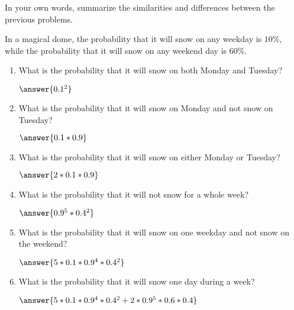 \documentclass[nooutcomes]{ximera}
\begin{document}
\begin{problem}
In your own words, summarize the similarities and differences between the previous problems.

\begin{freeResponse}
\end{freeResponse}
\end{problem}



\begin{problem}
In a magical dome, the probability that it will snow on any weekday is $10\%$, while the probability that it will snow on any weekend day is $60\%$.

\begin{enumerate}
	\item What is the probability that it will snow on both Monday and Tuesday? \begin{prompt} $\answer{0.1^2}$ \end{prompt}
	\item What is the probability that it will snow on Monday and not snow on Tuesday? \begin{prompt} $\answer{0.1*0.9}$ \end{prompt}
	\item What is the probability that it will snow on either Monday or Tuesday? \begin{prompt} $\answer{2*0.1*0.9}$ \end{prompt}
	\item What is the probability that it will not snow for a whole week? \begin{prompt} $\answer{0.9^5*0.4^2}$ \end{prompt}
	\item What is the probability that it will snow on one weekday and not snow on the weekend? \begin{prompt} $\answer{5*0.1*0.9^4*0.4^2}$ \end{prompt}
	\item What is the probability that it will snow one day during a week? \begin{prompt} $\answer{5*0.1*0.9^4*0.4^2+2*0.9^5*0.6*0.4}$ \end{prompt}
\end{enumerate}
\end{problem}
\end{document}
